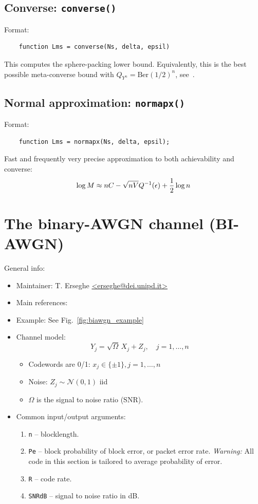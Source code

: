 \documentclass[a4paper,11p]{memoir}
\def\matn{\mathcal{N}}
\begin{document}
\section{Converse: \texttt{converse()}}
Format:
\begin{verbatim}
	function Lms = converse(Ns, delta, epsil)
\end{verbatim}

This computes the sphere-packing lower bound. Equivalently, this is the best possible meta-converse bound with $Q_{Y^n}
= \mathrm{Ber}(1/2)^n$, see~\cite[Theorem 35]{PPV08}. 


\section{Normal approximation: \texttt{normapx()}}

Format:
\begin{verbatim}
	function Lms = normapx(Ns, delta, epsil);
\end{verbatim}

Fast and frequently very precise approximation to both achievability and converse:
	$$ \log M \approx n C - \sqrt{nV} Q^{-1}(\epsilon) + {1\over2} \log n $$


\chapter{The binary-AWGN channel (BI-AWGN)}


General info:
\begin{itemize}
\item Maintainer: T. Erseghe \url{<erseghe@dei.unipd.it>}

\item Main references: \cite{erseghe2015coding}

\item Example: See Fig.~\ref{fig:biawgn_example} 

\item Channel model:
	$$ Y_j = \sqrt{\Omega} \,X_j + Z_j, \quad j=1,\ldots,n $$
	\begin{itemize}
	\item Codewords are 0/1: $x_j \in \{\pm1\}, j=1,\ldots,n$
	\item Noise: $Z_j \sim  \matn(0,1)$ iid
	\item $\Omega$ is the signal to noise ratio (SNR).\\
	\end{itemize}

\item Common input/output arguments:
\begin{enumerate}
\item \verb|n| -- blocklength.
\item \verb|Pe| -- block probability of block error, or packet error rate. \textit{Warning:} All code in this section is tailored to
average probability of error.
\item \verb|R| -- code rate. 
\item \verb|SNRdB| -- signal to noise ratio in dB.
\end{enumerate}
\end{itemize}
\end{document}
